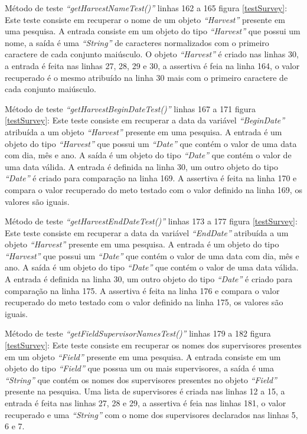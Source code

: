 Método de teste \textit{“getHarvestNameTest()”} linhas 162 a 165 figura \ref{testSurvey}: Este teste consiste em recuperar o nome de um objeto \textit{“Harvest”} presente em uma pesquisa. A entrada consiste em um objeto do tipo \textit{“Harvest”} que possui um nome, a saída é uma \textit{“String”} de caracteres normalizados com o primeiro caractere de cada conjunto maiúsculo. O objeto \textit{“Harvest”} é criado nas linhas 30, a entrada é feita nas linhas 27, 28, 29 e 30, a assertiva é feia na linha 164, o valor recuperado é o mesmo atribuído na linha 30 mais com o primeiro caractere de cada conjunto maiúsculo.

Método de teste \textit{“getHarvestBeginDateTest()”} linhas 167 a 171 figura \ref{testSurvey}: Este teste consiste em recuperar a data da variável \textit{“BeginDate”} atribuída a um objeto \textit{“Harvest”} presente em uma pesquisa. A entrada é um objeto do tipo \textit{“Harvest”} que possui um \textit{“Date”} que contém o valor de uma data com dia, mês e ano. A saída é um objeto do tipo \textit{“Date”} que contém o valor de uma data válida. A entrada é definida na linha 30, um outro objeto do tipo \textit{“Date”} é criado para comparação na linha 169. A assertiva é feita na linha 170 e compara o valor recuperado do meto testado com o valor definido na linha 169, os valores são iguais.  

Método de teste \textit{“getHarvestEndDateTest()”} linhas 173 a 177 figura \ref{testSurvey}: Este teste consiste em recuperar a data da variável \textit{“EndDate” }atribuída a um objeto \textit{“Harvest”} presente em uma pesquisa. A entrada é um objeto do tipo \textit{“Harvest”} que possui um \textit{“Date”} que contém o valor de uma data com dia, mês e ano. A saída é um objeto do tipo \textit{“Date”} que contém o valor de uma data válida. A entrada é definida na linha 30, um outro objeto do tipo \textit{“Date”} é criado para comparação na linha 175. A assertiva é feita na linha 176 e compara o valor recuperado do meto testado com o valor definido na linha 175, os valores são iguais.  

Método de teste \textit{“getFieldSupervisorNamesTest()”} linhas 179 a 182 figura \ref{testSurvey}: Este teste consiste em recuperar os nomes dos supervisores presentes em um objeto \textit{“Field”} presente em uma pesquisa. A entrada consiste em um objeto do tipo \textit{“Field”} que possua um ou mais supervisores, a saída é uma \textit{“String”} que contém os nomes dos supervisores presentes no objeto \textit{“Field”} presente na pesquisa. Uma lista de supervisores é criada nas linhas 12 a 15, a entrada é feita nas linhas 27, 28 e 29, a assertiva é feia nas linhas 181, o valor recuperado e uma \textit{“String”} com o nome dos supervisores declarados nas linhas 5, 6 e 7.

